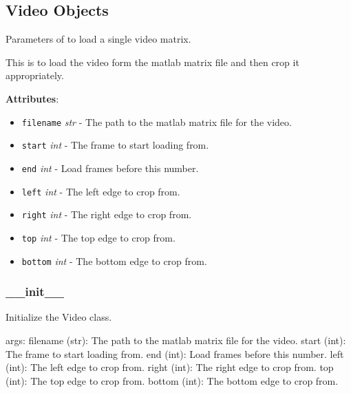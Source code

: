 
\subsection{Video Objects}

\begin{Shaded}
\begin{Highlighting}[]
\end{Highlighting}
\end{Shaded}

Parameters of to load a single video matrix.

This is to load the video form the matlab matrix file and then crop it
appropriately.

\textbf{Attributes}:

\begin{itemize}
\tightlist
\item
  \texttt{filename} \emph{str} - The path to the matlab matrix file for
  the video.
\item
  \texttt{start} \emph{int} - The frame to start loading from.
\item
  \texttt{end} \emph{int} - Load frames before this number.
\item
  \texttt{left} \emph{int} - The left edge to crop from.
\item
  \texttt{right} \emph{int} - The right edge to crop from.
\item
  \texttt{top} \emph{int} - The top edge to crop from.
\item
  \texttt{bottom} \emph{int} - The bottom edge to crop from.
\end{itemize}

\subsubsection{\_\_init\_\_}

\begin{Shaded}
\begin{Highlighting}[]
 \OperatorTok{|} 
\end{Highlighting}
\end{Shaded}

Initialize the Video class.

args: filename (str): The path to the matlab matrix file for the video.
start (int): The frame to start loading from. end (int): Load frames
before this number. left (int): The left edge to crop from. right (int):
The right edge to crop from. top (int): The top edge to crop from.
bottom (int): The bottom edge to crop from.

